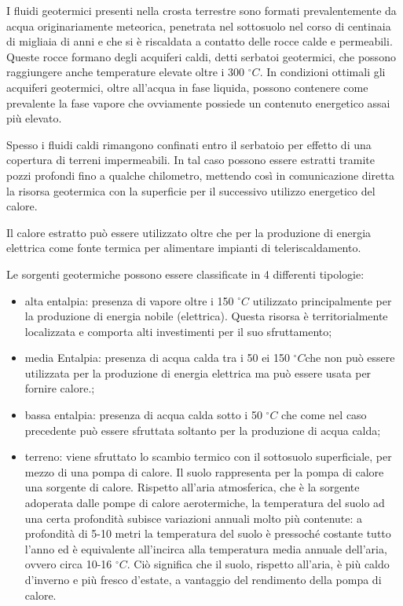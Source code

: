 \documentclass[laurea,oneside,11pt]{USiena_tesiLM}
\begin{document}
I fluidi geotermici presenti nella crosta terrestre sono formati prevalentemente da acqua originariamente meteorica, penetrata nel sottosuolo nel corso di centinaia di migliaia di anni e che si è riscaldata a contatto delle rocce calde e permeabili. Queste rocce formano degli acquiferi caldi, detti serbatoi geotermici, che possono raggiungere anche temperature elevate oltre i 300 $^{\circ}C$. In condizioni ottimali gli acquiferi geotermici, oltre all'acqua in fase liquida, possono contenere come prevalente la fase vapore che ovviamente possiede un contenuto energetico assai più elevato.

Spesso i fluidi caldi rimangono confinati entro il serbatoio per effetto di una copertura di terreni impermeabili. In tal caso possono essere estratti tramite pozzi profondi fino a qualche chilometro, mettendo così in comunicazione diretta la risorsa geotermica con la superficie per il successivo utilizzo energetico del calore. 

Il calore estratto può essere utilizzato oltre che per la produzione di energia elettrica come fonte termica per alimentare impianti di teleriscaldamento.

Le sorgenti geotermiche possono essere classificate in 4 differenti tipologie:
\begin{itemize}
\item alta entalpia: presenza di vapore oltre i 150 $^{\circ}C$ utilizzato principalmente per la produzione di energia nobile (elettrica). Questa risorsa è territorialmente localizzata e comporta alti investimenti per il suo sfruttamento;
\item media Entalpia: presenza di acqua calda tra i 50 ei 150 $^{\circ}C$che non può essere utilizzata per la produzione di energia elettrica ma può essere usata per fornire calore.;
\item bassa entalpia: presenza di acqua calda sotto i 50 $^{\circ}C$ che come nel caso precedente può essere sfruttata soltanto per la produzione di acqua calda;
\item terreno: viene sfruttato lo scambio termico con il sottosuolo superficiale, per mezzo di una pompa di calore. Il suolo rappresenta per la pompa di calore una sorgente di calore. Rispetto all'aria atmosferica, che è la sorgente adoperata dalle pompe di calore aerotermiche, la temperatura del suolo ad una certa profondità subisce variazioni annuali molto più contenute: a profondità di 5-10 metri la temperatura del suolo è pressoché costante tutto l'anno ed è equivalente all'incirca alla temperatura media annuale dell'aria, ovvero circa 10-16 $^{\circ}C$. Ciò significa che il suolo, rispetto all'aria, è più caldo d'inverno e più fresco d'estate, a vantaggio del rendimento della pompa di calore.
\end{itemize}
\end{document}
